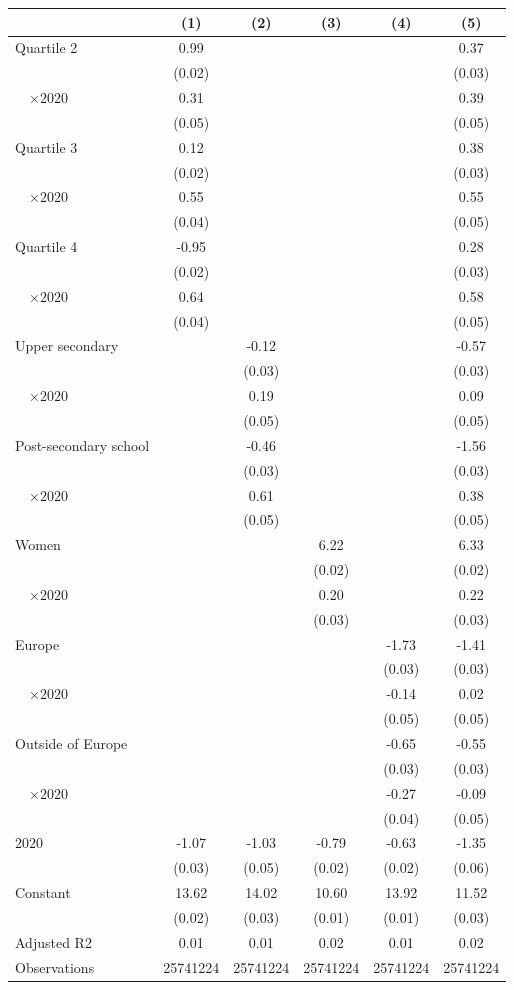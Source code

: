 
\begin{tabular}{@{}l*{5}{S[table-format={-}2.2{\tnote{***}}]}@{}}
\toprule
{} & {(1)} & {(2)} & {(3)} & {(4)} & {(5)}\tabularnewline%
\midrule
Quartile 2 & 0.99\tnote{***} &  &  &  & 0.37\tnote{***}\tabularnewline%
 & (0.02) &  &  &  & \vphantom{2} (0.03)\tabularnewline%
~~\(\times 2020\) & 0.31\tnote{***} &  &  &  & 0.39\tnote{***}\tabularnewline%
 & (0.05) &  &  &  & (0.05)\tabularnewline%
Quartile 3 & 0.12\tnote{***} &  &  &  & 0.38\tnote{***}\tabularnewline%
 & (0.02) &  &  &  & \vphantom{1} (0.03)\tabularnewline%
~~\(\times 2020\) & 0.55\tnote{***} &  &  &  & 0.55\tnote{***}\tabularnewline%
 & (0.04) &  &  &  & \vphantom{1} (0.05)\tabularnewline%
Quartile 4 & -0.95\tnote{***} &  &  &  & 0.28\tnote{***}\tabularnewline%
 & (0.02) &  &  &  & (0.03)\tabularnewline%
~~\(\times 2020\) & 0.64\tnote{***} &  &  &  & 0.58\tnote{***}\tabularnewline%
 & (0.04) &  &  &  & (0.05)\tabularnewline%
Upper secondary &  & -0.12\tnote{***} &  &  & -0.57\tnote{***}\tabularnewline%
 &  & (0.03) &  &  & \vphantom{1} (0.03)\tabularnewline%
~~\(\times 2020\) &  & 0.19\tnote{***} &  &  & 0.09\tnote{\dagger}\tabularnewline%
 &  & (0.05) &  &  & \vphantom{1} (0.05)\tabularnewline%
Post-secondary school &  & -0.46\tnote{***} &  &  & -1.56\tnote{***}\tabularnewline%
 &  & (0.03) &  &  & (0.03)\tabularnewline%
~~\(\times 2020\) &  & 0.61\tnote{***} &  &  & 0.38\tnote{***}\tabularnewline%
 &  & (0.05) &  &  & (0.05)\tabularnewline%
Women &  &  & 6.22\tnote{***} &  & 6.33\tnote{***}\tabularnewline%
 &  &  & (0.02) &  & (0.02)\tabularnewline%
~~\(\times 2020\) &  &  & 0.20\tnote{***} &  & 0.22\tnote{***}\tabularnewline%
 &  &  & (0.03) &  & (0.03)\tabularnewline%
Europe &  &  &  & -1.73\tnote{***} & -1.41\tnote{***}\tabularnewline%
 &  &  &  & (0.03) & \vphantom{1} (0.03)\tabularnewline%
~~\(\times 2020\) &  &  &  & -0.14\tnote{**} & 0.02\tabularnewline%
 &  &  &  & (0.05) & (0.05)\tabularnewline%
Outside of Europe &  &  &  & -0.65\tnote{***} & -0.55\tnote{***}\tabularnewline%
 &  &  &  & (0.03) & (0.03)\tabularnewline%
~~\(\times 2020\) &  &  &  & -0.27\tnote{***} & -0.09\tnote{*}\tabularnewline%
 &  &  &  & (0.04) & (0.05)\tabularnewline%
\midrule
\(2020\) & -1.07\tnote{***} & -1.03\tnote{***} & -0.79\tnote{***} & -0.63\tnote{***} & -1.35\tnote{***}\tabularnewline%
 & (0.03) & (0.05) & (0.02) & (0.02) & (0.06)\tabularnewline%
Constant & 13.62\tnote{***} & 14.02\tnote{***} & 10.60\tnote{***} & 13.92\tnote{***} & 11.52\tnote{***}\tabularnewline%
 & (0.02) & (0.03) & (0.01) & (0.01) & (0.03)\tabularnewline%
\midrule
Adjusted R2 & 0.01 & 0.01 & 0.02 & 0.01 & 0.02\tabularnewline%
Observations & {\num{25741224}} & {\num{25741224}} & {\num{25741224}} & {\num{25741224}} & {\num{25741224}}\tabularnewline%
\bottomrule
\end{tabular}
